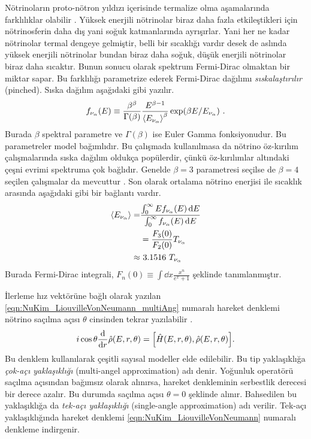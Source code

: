 Nötrinoların proto-nötron yıldızı içerisinde termalize olma aşamalarında farklılıklar olabilir \cite{Keil:2002in}. Yüksek enerjili nötrinolar biraz daha fazla etkileştikleri için nötrinosferin daha dış yani soğuk katmanlarında ayrışırlar. Yani her ne kadar nötrinolar termal dengeye gelmiştir, belli bir sıcaklığı vardır desek de aslında yüksek enerjili nötrinolar bundan biraz daha soğuk, düşük enerjili nötrinolar biraz daha sıcaktır. Bunun sonucu olarak spektrum Fermi-Dirac olmaktan bir miktar sapar. Bu farklılığı parametrize ederek Fermi-Dirac dağılımı \emph{sıskalaştırılır} (pinched). Sıska dağılım aşağıdaki gibi yazılır.
\begin{equation}
    f_{\nu_{\alpha}}(E) \equiv \dfrac{\beta^{\beta}}{\Gamma (\beta)} \dfrac{E^{\beta-1}}{\expval{E_{\nu_{\alpha}}}^{\beta}} \exp (\beta E/E_{\nu_{\alpha}}) \text{ .}
\end{equation}
Burada $ \beta $ spektral parametre ve $ \Gamma (\beta) $ ise Euler Gamma fonksiyonudur. Bu parametreler model bağımlıdır. Bu çalışmada kullanılmasa da nötrino öz-kırılım çalışmalarında sıska dağılım oldukça popülerdir, çünkü öz-kırılımlar altındaki çeşni evrimi spektruma çok bağlıdır. Genelde $ \beta=3 $ parametresi seçilse de $ \beta=4 $ seçilen çalışmalar da mevcuttur \cite{Dasgupta:2010cd}. Son olarak ortalama nötrino enerjisi ile sıcaklık arasında aşağıdaki gibi bir bağlantı vardır.
\begin{align}
    \nonumber \expval{E_{\nu_{\alpha}}} = & \dfrac{\int^{\infty}_{0} E f_{\nu_{\alpha}}(E)\dd{E} }{\int^{\infty}_{0} f_{\nu_{\alpha}}(E)\dd{E} } \\
    \nonumber & = \frac{F_{3}(0)}{F_{2}(0)}T_{\nu_{\alpha}} \\
    \approx & ~3.1516 ~ T_{\nu_{\alpha}}
\end{align}
Burada Fermi-Dirac integrali, $ F_{n}(0) \equiv \int \dd{x} \frac{x^{n}}{e^{x}+1} $ şeklinde tanımlanmıştır.

İlerleme hız vektörüne bağlı olarak yazılan \eqref{eqn:NuKim_LiouvilleVonNeumann_multiAng} numaralı hareket denklemi nötrino saçılma açısı $ \theta $ cinsinden tekrar yazılabilir \cite{Sigl:1993ctk,Cardall:2007zw}.
\begin{equation}
    i \cos \theta \dv{r} \hat{\rho}(E,r,\theta) = \comm{\hat{H}(E,r,\theta)}{\hat{\rho}(E,r,\theta)} \text{.}
\end{equation}
Bu denklem kullanılarak çeşitli sayısal modeller elde edilebilir. Bu tip yaklaşıklığa \emph{çok-açı yaklaşıklığı} (multi-angel approximation) adı denir. Yoğunluk operatörü saçılma açısından bağımsız olarak alınırsa, hareket denkleminin serbestlik derecesi bir derece azalır. Bu durumda saçılma açısı $ \theta= 0 $ şeklinde alınır. Bahsedilen bu yaklaşıklığa da \emph{tek-açı yaklaşıklığı} (single-angle approximation) adı verilir. Tek-açı yaklaşıklığında hareket denklemi \eqref{eqn:NuKim_LiouvilleVonNeumann} numaralı denkleme indirgenir.

